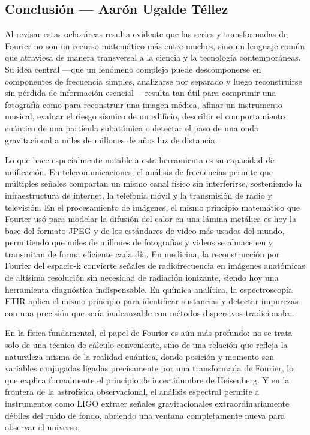 \clearpage

\subsection{Conclusión — Aarón Ugalde Téllez}
\label{sec:cap01:conclusiones:aaron}

Al revisar estas ocho áreas resulta evidente que las series y transformadas de Fourier no son un recurso matemático más entre muchos, sino un lenguaje común que atraviesa de manera transversal a la ciencia y la tecnología contemporáneas. Su idea central —que un fenómeno complejo puede descomponerse en componentes de frecuencia simples, analizarse por separado y luego reconstruirse sin pérdida de información esencial— resulta tan útil para comprimir una fotografía como para reconstruir una imagen médica, afinar un instrumento musical, evaluar el riesgo sísmico de un edificio, describir el comportamiento cuántico de una partícula subatómica o detectar el paso de una onda gravitacional a miles de millones de años luz de distancia.

Lo que hace especialmente notable a esta herramienta es su capacidad de unificación. En telecomunicaciones, el análisis de frecuencias permite que múltiples señales compartan un mismo canal físico sin interferirse, sosteniendo la infraestructura de internet, la telefonía móvil y la transmisión de radio y televisión. En el procesamiento de imágenes, el mismo principio matemático que Fourier usó para modelar la difusión del calor en una lámina metálica es hoy la base del formato JPEG y de los estándares de video más usados del mundo, permitiendo que miles de millones de fotografías y videos se almacenen y transmitan de forma eficiente cada día. En medicina, la reconstrucción por Fourier del espacio-k convierte señales de radiofrecuencia en imágenes anatómicas de altísima resolución sin necesidad de radiación ionizante, siendo hoy una herramienta diagnóstica indispensable. En química analítica, la espectroscopía FTIR aplica el mismo principio para identificar sustancias y detectar impurezas con una precisión que sería inalcanzable con métodos dispersivos tradicionales.

En la física fundamental, el papel de Fourier es aún más profundo: no se trata solo de una técnica de cálculo conveniente, sino de una relación que refleja la naturaleza misma de la realidad cuántica, donde posición y momento son variables conjugadas ligadas precisamente por una transformada de Fourier, lo que explica formalmente el principio de incertidumbre de Heisenberg. Y en la frontera de la astrofísica observacional, el análisis espectral permite a instrumentos como LIGO extraer señales gravitacionales extraordinariamente débiles del ruido de fondo, abriendo una ventana completamente nueva para observar el universo.


